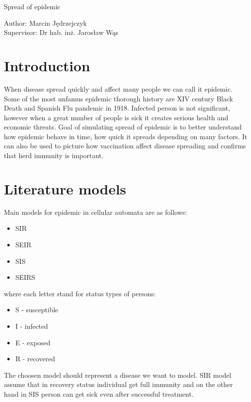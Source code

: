 \documentclass[a4paper, 11pt]{article}
\begin{document}
\renewcommand\refname{Bibliography}
	\begin{center}
			\begin{LARGE}
			Spread of epidemic\\[1cm]
		    \end{LARGE}
	    	\begin{Large}
	    		Author: Marcin Jędrzejczyk \\
	    		Supervisor: Dr hab. inż. Jarosław Wąs\\[3cm]
	    	\end{Large}
	\end{center}

	\section{Introduction}
	When disease spread quickly and affect many people we can call it epidemic. Some of the most unfamus epidemic thorough history are XIV century Black Death and Spanish  Flu pandemic in 1918. Infected person is not significant, however when a great number of people is sick it creates serious health and economic threats. Goal of simulating spread of epidemic is to better understand how epidemic behave in time, how quick it spreads depending on many factors.\cite{white} It can also be used to picture how vaccination affect disease spreading and confirms that herd immunity is important.
	\section{Literature models}
	Main models for epidemic in cellular automata are as follows:\\
	\begin{itemize}
		\item SIR
		\item SEIR
		\item SIS
		\item SEIRS	
	\end{itemize}
	where each letter stand for status types of persons:
	\begin{itemize}
		\item S - susceptible 
		\item I - infected 
		\item E - exposed
		\item R - recovered
	\end{itemize}
	The choosen model should represent a disease we want to model. SIR model assume that in recovery status individual get full immunity and on the other hand in SIS person can get sick even after successful treatment.\cite{WHITE}\\
	
\end{document}
